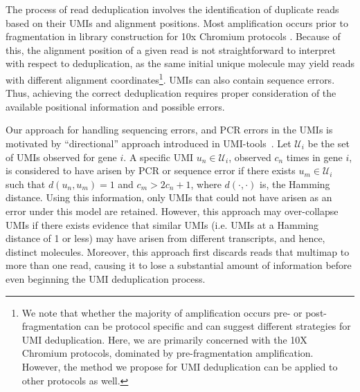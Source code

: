 The process of read deduplication involves the identification of duplicate reads based on their UMIs and alignment positions. Most amplification occurs prior to fragmentation in library construction for 10x Chromium protocols \citep{v2kit}. Because of this, the alignment position of a given read is not straightforward to interpret with respect to deduplication, as the same initial unique molecule may yield reads with different alignment coordinates\footnote[2]{We note that whether the majority of amplification occurs pre- or post-fragmentation can be protocol specific and can suggest different strategies for UMI deduplication. Here, we are primarily concerned with the 10X Chromium protocols, dominated by pre-fragmentation amplification. However, the method we propose for UMI deduplication can be applied to other protocols as well.}. UMIs can also contain sequence errors. Thus, achieving the correct deduplication requires proper consideration of the available positional information and possible errors. 

Our approach for handling sequencing errors, and PCR errors in the UMIs is motivated by ``directional'' approach introduced in UMI-tools~\citep{umitools}. Let $\mathcal{U}_i$ be the set of UMIs observed for gene $i$. A specific UMI $u_n \in \mathcal{U}_i$, observed $c_n$ times in gene $i$, is considered to have arisen by PCR or sequence error if there exists $u_m \in \mathcal{U}_i$ such that $d(u_n, u_m) = 1$ and $c_m > 2c_n + 1$, where $d(\cdot,\cdot)$ is, the Hamming distance. Using this information, only UMIs that could not have arisen as an error under this model are retained. However, this approach may over-collapse UMIs if there exists evidence that similar UMIs (i.e. UMIs at a Hamming distance of 1 or less) may have arisen from different transcripts, and hence, distinct molecules.  Moreover, this approach first discards reads that multimap to more than one read, causing it to lose a substantial amount of information before even beginning the UMI deduplication process.

